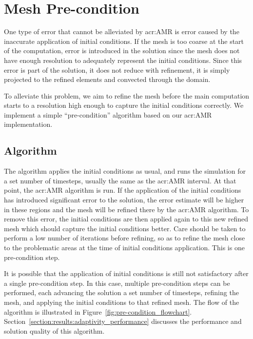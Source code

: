 \section{Mesh Pre-condition}\label{section:adaptive_mesh_refinement:pre_conditioning}

One type of error that cannot be alleviated by \acrshort{acr:AMR} is error caused by the inaccurate
application of initial conditions. If the mesh is too coarse at the start of the computation, error
is introduced in the solution since the mesh does not have enough resolution to adequately represent
the initial conditions. Since this error is part of the solution, it does not reduce with
refinement, it is simply projected to the refined elements and convected through the domain.

To alleviate this problem, we aim to refine the mesh before the main computation starts to a
resolution high enough to capture the initial conditions correctly. We implement a simple
``pre-condition'' algorithm based on our \acrshort{acr:AMR} implementation.

\subsection{Algorithm}\label{section:adaptive_mesh_refinement:pre_conditioning:algorithm}

The algorithm applies the initial conditions as usual, and runs the simulation for a set number of
timesteps, usually the same as the \acrshort{acr:AMR} interval. At that point, the
\acrshort{acr:AMR} algorithm is run. If the application of the initial conditions has introduced
significant error to the solution, the error estimate will be higher in these regions and the mesh
will be refined there by the \acrshort{acr:AMR} algorithm. To remove this error, the initial
conditions are then applied again to this new refined mesh which should capture the initial
conditions better. Care should be taken to perform a low number of iterations before refining, so as
to refine the mesh close to the problematic areas at the time of initial conditions application.
This is one pre-condition step.

It is possible that the application of initial conditions is still not satisfactory after a single
pre-condition step. In this case, multiple pre-condition steps can be performed, each advancing the
solution a set number of timesteps, refining the mesh, and applying the initial conditions to that
refined mesh. The flow of the algorithm is illustrated in Figure~\ref{fig:pre-condition_flowchart}.
Section~\ref{section:results:adaptivity_performance} discusses the performance and solution quality
of this algorithm.


